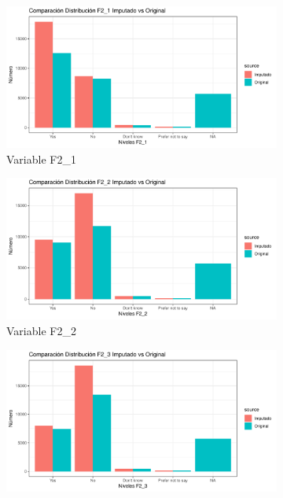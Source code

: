 \documentclass[a4paper, 11pt]{article}
\begin{document}
\begin{center}    
\begin{figure}[htbp]
    \centering
    \begin{subfigure}[t]{0.45\linewidth}
        \centering
        \includegraphics[width=\linewidth]{images/Analysis_MV_F2_1.pdf}
        \caption{Variable F2\_1}
        \label{fig:Analysis_MV_F2_1}
    \end{subfigure}
    \hfill 
    \begin{subfigure}[t]{0.45\linewidth}
        \centering
        \includegraphics[width=\linewidth]{images/Analysis_MV_F2_2.pdf}
        \caption{Variable F2\_2 }
        \label{fig:Analysis_MV_F2_2}
    \end{subfigure}
    \hfill 
    \begin{subfigure}[t]{0.45\linewidth}
        \centering
        \includegraphics[width=\linewidth]{images/Analysis_MV_F2_3.pdf}

\end{subfigure}
\end{figure}
\end{center}
\end{document}
